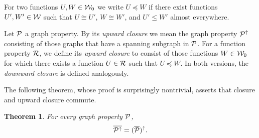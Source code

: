 \documentclass{article}
\newtheorem{theorem}{Theorem}[section]
\begin{document}
For two functions $U,W\in\mathcal{W}_0$ we write $U\preceq W$ if there exist
functions $U',W'\in\mathcal{W}$ such that $U\cong U'$, $W\cong W'$, and
$U'\le W'$ almost everywhere.

Let $\mathcal{P}$ a graph property. By its {\it upward closure} we mean the
graph property $\mathcal{P}^\uparrow$ consisting of those graphs that have a
spanning subgraph in $\mathcal{P}$. For a function property $\mathcal{R}$, we define
its {\it upward closure} to consist of those functions $W\in\mathcal{W}_0$
for which there exists a function $U\in\mathcal{R}$ such that $U\preceq W$.
In both versions, the {\it downward closure} is defined analogously.

The following theorem, whose proof is surprisingly nontrivial,
asserts that closure and upward closure commute.

\begin{theorem}\label{THM:UP}
For every graph property $\mathcal{P}$,
\[
\overline{\mathcal{P}^\uparrow} =(\overline{\mathcal{P}})^\uparrow.
\]
\end{theorem}
\end{document}
